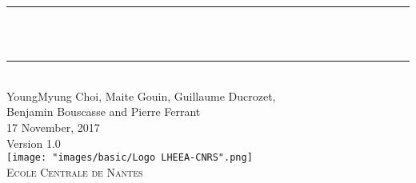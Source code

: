 
\fancyhf{}
\cfoot{\thepage}

\makeatletter
\let\thetitle\@title
\let\theauthor\@author
\let\thedate\@date
\makeatother


\begin{titlepage}
	\centering
    \vspace*{0.5 cm}    

	\rule{\linewidth}{0.2 mm} \\[0.8 cm]
	{ \huge \bfseries \thetitle}\\[0.3 cm]
	\rule{\linewidth}{0.2 mm} \\[0.8 cm]
	\textup{\large YoungMyung Choi, Maite Gouin, Guillaume Ducrozet, }\\[0.5 cm]		
	\textup{\large Benjamin Bouscasse and Pierre Ferrant}\\[1.0 cm]		
	
	\large{17 November, 2017} \\[0.5cm]	
	\large{Version 1.0} \\[4.0cm]

	\texttt{[image: "images/basic/Logo LHEEA-CNRS".png]}  \\[1.5 cm]
	
	 \textsc{\LARGE Ecole Centrale de Nantes}\\[1.0 cm]	%
	 
\end{titlepage}